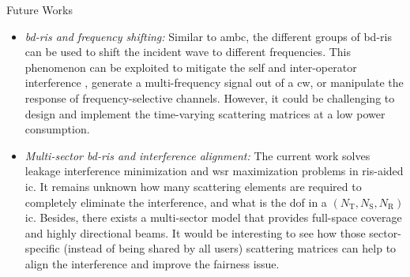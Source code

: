 \begin{section}{Future Works}
\begin{itemize}
		\item \emph{\gls{bd}-\gls{ris} and frequency shifting:} Similar to \gls{ambc}, the different groups of \gls{bd}-\gls{ris} can be used to shift the incident wave to different frequencies.
		This phenomenon can be exploited to mitigate the self and inter-operator interference \cite{Miridakis2024}, generate a multi-frequency signal out of a \gls{cw}, or manipulate the response of frequency-selective channels. However, it could be challenging to design and implement the time-varying scattering matrices at a low power consumption.
		\item \emph{Multi-sector \gls{bd}-\gls{ris} and interference alignment:} The current work solves leakage interference minimization and \gls{wsr} maximization problems in \gls{ris}-aided \gls{ic}.
		It remains unknown how many scattering elements are required to completely eliminate the interference, and what is the \gls{dof} in a $(N_\mathrm{T},N_\mathrm{S},N_\mathrm{R})$ \gls{ic}.
		Besides, there exists a multi-sector model \cite{Li2023c} that provides full-space coverage and highly directional beams.
		It would be interesting to see how those sector-specific (instead of being shared by all users) scattering matrices can help to align the interference and improve the fairness issue.
	\end{itemize}
\end{section}
